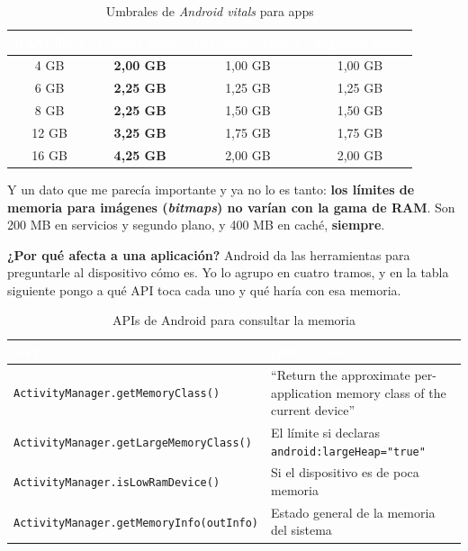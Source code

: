 \documentclass[11pt,a4paper]{article}
\newcommand{\code}[1]{\texttt{\color{primary}#1}}
\newcommand{\campo}[1]{\textbf{\color{primary}#1}}
\begin{document}
	\begin{table}[htbp]
		\centering
		\small
		\begin{tabular}{@{}c c c c@{}}
			\toprule
			\rowcolor{primary}
			\textcolor{white}{\sffamily\bfseries RAM física} & \textcolor{white}{\sffamily\bfseries Primer plano} & \textcolor{white}{\sffamily\bfseries Servicios visibles} & \textcolor{white}{\sffamily\bfseries Segundo plano} \\
			\midrule
			4 GB & \textbf{2,00 GB} & 1,00 GB & 1,00 GB \\
			\rowcolor{soft}
			6 GB & \textbf{2,25 GB} & 1,25 GB & 1,25 GB \\
			8 GB & \textbf{2,25 GB} & 1,50 GB & 1,50 GB \\
			\rowcolor{soft}
			12 GB & \textbf{3,25 GB} & 1,75 GB & 1,75 GB \\
			16 GB & \textbf{4,25 GB} & 2,00 GB & 2,00 GB \\
			\bottomrule
		\end{tabular}
		\caption{Umbrales de \emph{Android vitals} para apps}
	\end{table}
	
	Y un dato que me parecía importante y ya no lo es tanto: \textbf{los límites de memoria para imágenes (\emph{bitmaps}) no varían con la gama de RAM}. Son 200 MB en servicios y segundo plano, y 400 MB en caché, \textbf{siempre}.
	
	\campo{¿Por qué afecta a una aplicación?}
	Android da las herramientas para preguntarle al dispositivo cómo es. Yo lo agrupo en cuatro tramos, y en la tabla siguiente pongo a qué API toca cada uno y qué haría con esa memoria.
	
	\begin{table}[htbp]
		\centering
		\small
		\begin{tabularx}{\textwidth}{@{}>{\RaggedRight\arraybackslash}p{6cm} >{\RaggedRight\arraybackslash}X@{}}
			\toprule
			\rowcolor{primary}
			\textcolor{white}{\sffamily\bfseries API} & \textcolor{white}{\sffamily\bfseries Qué te dice} \\
			\midrule
			\code{ActivityManager.getMemoryClass()} & \enquote{Return the approximate per-application memory class of the current device} \\
			\rowcolor{soft}
			\code{ActivityManager.getLargeMemoryClass()} & El límite si declaras \code{android:largeHeap="true"} \\
			\code{ActivityManager.isLowRamDevice()} & Si el dispositivo es de poca memoria \\
			\rowcolor{soft}
			\code{ActivityManager.getMemoryInfo(outInfo)} & Estado general de la memoria del sistema \\
			\bottomrule
		\end{tabularx}
		\caption{APIs de Android para consultar la memoria}
	\end{table}
	
\end{document}
